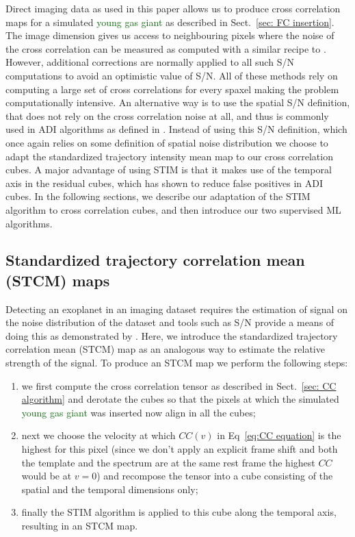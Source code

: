 \documentclass{aa}
\newcommand{\newchange}[1]{\textcolor{darkgreen}{#1}}
\begin{document}
Direct imaging data as used in this paper allows us to produce cross correlation maps for a simulated \newchange{young gas giant} as described in Sect.~\ref{sec: FC insertion}.
The image dimension gives us access to neighbouring pixels where the noise of the cross correlation can be measured as computed with a similar recipe to \citet{2022Patapis}.
However, additional corrections are normally applied to all such S/N computations to avoid an optimistic value of S/N.
All of these methods rely on computing a large set of cross correlations for every spaxel making the problem computationally intensive.
An alternative way is to use the spatial S/N definition, that does not rely on the cross correlation noise at all, and thus is commonly used in ADI algorithms as defined in \citet{2014MawetSNR}.
Instead of using this S/N definition, which once again relies on some definition of spatial noise distribution we choose to adapt the standardized trajectory intensity mean \citep[STIM,][]{2019Pairet} map to our cross correlation cubes. 
A major advantage of using STIM is that it makes use of the temporal axis in the residual cubes, which has shown to reduce false positives in ADI cubes.
In the following sections, we describe our adaptation of the STIM algorithm to cross correlation cubes, and then introduce our two supervised ML algorithms.

\subsection{Standardized trajectory correlation mean (STCM) maps}

Detecting an exoplanet in an imaging dataset requires the estimation of signal on the noise distribution of the dataset and tools such as S/N provide a means of doing this as demonstrated by \citet{2014MawetSNR}.
Here, we introduce the standardized trajectory correlation mean (STCM) map as an analogous way to estimate the relative strength of the signal. To produce an STCM map we perform the following steps:
\begin{enumerate}
    \item we first compute the cross correlation tensor as described in Sect.~\ref{sec: CC algorithm} and derotate the cubes so that the pixels at which the simulated \newchange{young gas giant} was inserted now align in all the cubes;
    \item next we choose the velocity at which $CC(v)$ in Eq~\ref{eq:CC equation} is the highest for this pixel (since we don't apply an explicit frame shift and both the template and the spectrum are at the same rest frame the highest $CC$ would be at $v=0$) and recompose the tensor into a cube consisting of the spatial and the temporal dimensions only;
    \item finally the STIM algorithm is applied to this cube along the temporal axis, resulting in an STCM map.
\end{enumerate}
\end{document}
